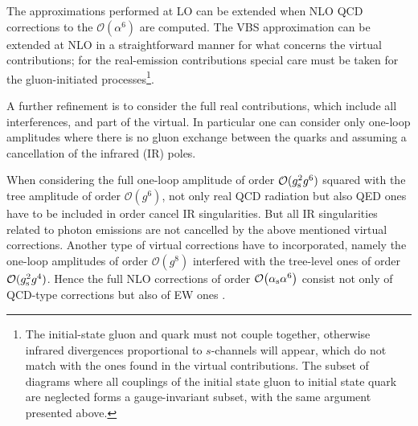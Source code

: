 The approximations performed at LO can be extended when NLO QCD corrections to the $\mathcal{O}{\left(\alpha^{6}\right)}$ are computed.
The VBS approximation can be extended at NLO in a straightforward manner for what concerns the virtual contributions; 
for the real-emission contributions special care must be taken for the gluon-initiated processes\footnote{The initial-state gluon and quark 
    must not couple together, otherwise infrared divergences proportional to $s$-channels will appear, 
     which do not match with the ones found in the virtual contributions.
     The subset of diagrams where all couplings of the initial state gluon to initial state quark are neglected forms a gauge-invariant subset, with the same argument presented above.}.
     \iffalse
This is implemented in the {\sc Powheg-Box}.
This approximation can be used in combination with a double-pole approximation \cite{Dittmaier:2015bfe} for the virtual contribution.
Such an approximation is implemented in {\sc Bonsay}.
In {\sc VBFNLO}, the $s$-channel contributions are available as well and can be
added on top of the VBS approximation. For the real emission diagrams, thereby
as simplification the gluon emission is fully modelled only for initial-state
radiation\AK{I don't understand this sentence. What does 'thereby' refer to?}. The effect of final-state radiation together with the corresponding
virtual contributions is included as a $K$-factor. 
\fi

A further refinement is to consider the full real contributions, which include all interferences, and part of the virtual.
In particular one can consider only one-loop amplitudes where there is no gluon exchange between the quarks and 
assuming a cancellation of the infrared (IR) poles.

When considering the full one-loop amplitude of order $\mathcal{O}(g_{\rm s}^2 g^6)$ squared with the tree amplitude of order $\mathcal{O}(g^6)$, not only real QCD radiation but also QED ones have to be included in order cancel IR singularities.
But all IR singularities related to photon emissions are not cancelled by the above mentioned virtual corrections.
Another type of virtual corrections have to incorporated, namely the one-loop amplitudes of order $\mathcal{O}(g^8)$ interfered with the tree-level ones of order $\mathcal{O}(g_{\rm s}^2 g^4)$.
Hence the full NLO corrections of order $\mathcal{O}{\left(\alpha_\text{s} \alpha^{6}\right)}$ consist not only of QCD-type corrections but also of EW ones \cite{Biedermann:2017bss}.

